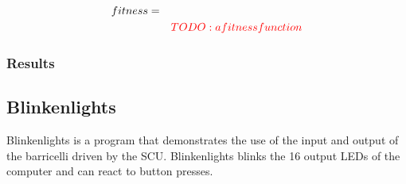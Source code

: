 \begin{eqnarray}
\nonumber 
fitness & = & \\
        &   & \textcolor{red}{TODO:a fitness function}
\label{equation:color-search-fitness-function}
\end{eqnarray}

\subsubsection{Results}


\subsection{Blinkenlights}

Blinkenlights is a program that demonstrates the use of the input and output of the \Gls{barricelli} driven by the \Gls{SCU}.
Blinkenlights blinks the 16 output LEDs of the computer and can react to button presses.

